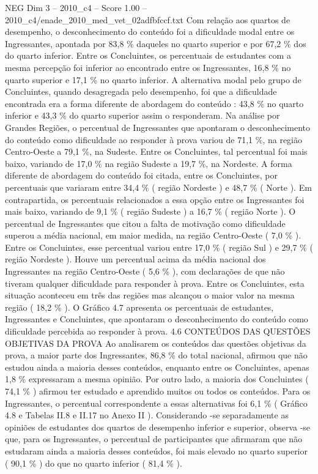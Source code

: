 \begin{textsample}{NEG Dim 3 – 2010\_c4 – Score 1.00 – 2010\_c4/enade\_2010\_med\_vet\_02adfbfccf.txt}
Com relação aos quartos de desempenho, o desconhecimento do conteúdo foi a dificuldade modal entre os Ingressantes, apontada por 83,8 \% daqueles no quarto superior e por 67,2 \% dos do quarto inferior.
Entre os Concluintes, os percentuais de estudantes com a mesma percepção foi inferior ao encontrado entre os Ingressantes, 16,8 \% no quarto superior e 17,1 \% no quarto inferior.
A alternativa modal pelo grupo de Concluintes, quando desagregada pelo desempenho, foi que a dificuldade encontrada era a forma diferente de abordagem do conteúdo : 43,8 \% no quarto inferior e 43,3 \% do quarto superior assim o responderam.
Na análise por Grandes Regiões, o percentual de Ingressantes que apontaram o desconhecimento do conteúdo como dificuldade ao responder à prova variou de 71,1 \%, na região Centro-Oeste a 79,1 \%, na Sudeste.
Entre os Concluintes, tal percentual foi mais baixo, variando de 17,0 \% na região Sudeste a 19,7 \%, na Nordeste.
A forma diferente de abordagem do conteúdo foi citada, entre os Concluintes, por percentuais que variaram entre 34,4 \% ( região Nordeste ) e 48,7 \% ( Norte ).
Em contrapartida, os percentuais relacionados a essa opção entre os Ingressantes foi mais baixo, variando de 9,1 \% ( região Sudeste ) a 16,7 \% ( região Norte ).
O percentual de Ingressantes que citou a falta de motivação como dificuldade superou a média nacional, em maior medida, na região Centro-Oeste ( 7,0 \% ).
Entre os Concluintes, esse percentual variou entre 17,0 \% ( região Sul ) e 29,7 \% ( região Nordeste ).
Houve um percentual acima da média nacional dos Ingressantes na região Centro-Oeste ( 5,6 \% ), com declarações de que não tiveram qualquer dificuldade para responder à prova.
Entre os Concluintes, esta situação aconteceu em três das regiões mas alcançou o maior valor na mesma região ( 18,2 \% ).
O Gráfico 4.7 apresenta os percentuais de estudantes, Ingressantes e Concluintes, que apontaram o desconhecimento do conteúdo como dificuldade percebida ao responder à prova. 4.6 CONTEÚDOS DAS QUESTÕES OBJETIVAS DA PROVA Ao analisarem os conteúdos das questões objetivas da prova, a maior parte dos Ingressantes, 86,8 \% do total nacional, afirmou que não estudou ainda a maioria desses conteúdos, enquanto entre os Concluintes, apenas 1,8 \% expressaram a mesma opinião.
Por outro lado, a maioria dos Concluintes ( 74,1 \% ) afirmou ter estudado e aprendido muitos ou todos os conteúdos.
Para os Ingressantes, o percentual correspondente a essas alternativas foi 6,1 \% ( Gráfico 4.8 e Tabelas II.8 e II.17 no Anexo II ).
Considerando -se separadamente as opiniões de estudantes dos quartos de desempenho inferior e superior, observa -se que, para os Ingressantes, o percentual de participantes que afirmaram que não estudaram ainda a maioria desses conteúdos, foi mais elevado no quarto superior ( 90,1 \% ) do que no quarto inferior ( 81,4 \% ).

\end{textsample}
